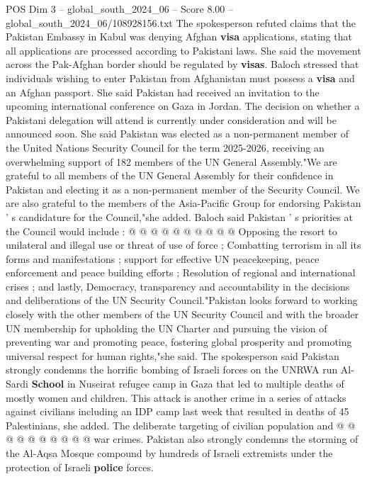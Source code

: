 \begin{textsample}{POS Dim 3 – global\_south\_2024\_06 – Score 8.00 – global\_south\_2024\_06/108928156.txt}  \label{ex:f3_pos_346}
The spokesperson refuted claims that the Pakistan Embassy in Kabul was denying Afghan \textbf{visa} applications, stating that all applications are processed according to Pakistani laws.
She said the movement across the Pak-Afghan border should be regulated by \textbf{visas}.
Baloch stressed that individuals wishing to enter Pakistan from Afghanistan must possess a \textbf{visa} and an Afghan passport.
She said Pakistan had received an invitation to the upcoming international conference on Gaza in Jordan.
The decision on whether a Pakistani delegation will attend is currently under consideration and will be announced soon.
She said Pakistan was elected as a non-permanent member of the United Nations Security Council for the term 2025-2026, receiving an overwhelming support of 182 members of the UN General Assembly."We are grateful to all members of the UN General Assembly for their confidence in Pakistan and electing it as a non-permanent member of the Security Council.
We are also grateful to the members of the Asia-Pacific Group for endorsing Pakistan ' s candidature for the Council,"she added.
Baloch said Pakistan ' s priorities at the Council would include : @ @ @ @ @ @ @ @ @ @ Opposing the resort to unilateral and illegal use or threat of use of force ; Combatting terrorism in all its forms and manifestations ; support for effective UN peacekeeping, peace enforcement and peace building efforts ; Resolution of regional and international crises ; and lastly, Democracy, transparency and accountability in the decisions and deliberations of the UN Security Council."Pakistan looks forward to working closely with the other members of the UN Security Council and with the broader UN membership for upholding the UN Charter and pursuing the vision of preventing war and promoting peace, fostering global prosperity and promoting universal respect for human rights,"she said.
The spokesperson said Pakistan strongly condemns the horrific bombing of Israeli forces on the UNRWA run Al-Sardi \textbf{School} in Nuseirat refugee camp in Gaza that led to multiple deaths of mostly women and children.
This attack is another crime in a series of attacks against civilians including an IDP camp last week that resulted in deaths of 45 Palestinians, she added.
The deliberate targeting of civilian population and @ @ @ @ @ @ @ @ @ @ war crimes.
Pakistan also strongly condemns the storming of the Al-Aqsa Mosque compound by hundreds of Israeli extremists under the protection of Israeli \textbf{police} forces.

\end{textsample}
